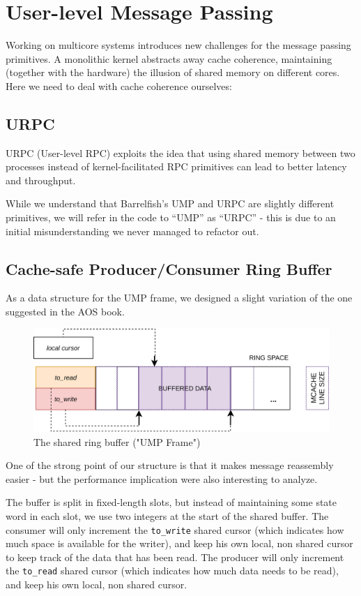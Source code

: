 \documentclass[a4paper,twoside,openright]{report}
\begin{document}
\newpage
\section{User-level Message Passing}
Working on multicore systems introduces new challenges for the message passing primitives. A monolithic kernel abstracts away cache coherence, maintaining (together with the hardware) the illusion of shared memory on different cores. Here we need to deal with cache coherence ourselves: 

\subsection{URPC}
URPC (User-level RPC) exploits the idea that using shared memory between two processes instead of kernel-facilitated RPC primitives can lead to better latency and throughput.

While we understand that Barrelfish's UMP and URPC are slightly different primitives, we will refer in the code to ``UMP'' as ``URPC'' - this is due to an initial misunderstanding we never managed to refactor out.

\subsection{Cache-safe Producer/Consumer Ring Buffer}
As a data structure for the UMP frame, we designed a slight variation of the one suggested in the AOS book. 

\begin{figure}[ht]
	\centering
	\includegraphics[width=0.9\linewidth]{assets/urpcframe}
	\caption{The shared ring buffer ("UMP Frame")}
	\label{fig:urpcframe}
\end{figure}

One of the strong point of our structure is that it makes message reassembly easier - but the performance implication were also interesting to analyze.

The buffer is split in fixed-length slots, but instead of maintaining some state word in each slot, we use two integers at the start of the shared buffer. 
The consumer will only increment the \texttt{to\_write} shared cursor (which indicates how much space is available for the writer), and keep his own local, non shared cursor to keep track of the data that has been read.
The producer will only increment the \texttt{to\_read} shared cursor (which indicates how much data needs to be read), and keep his own local, non shared cursor.
\end{document}
